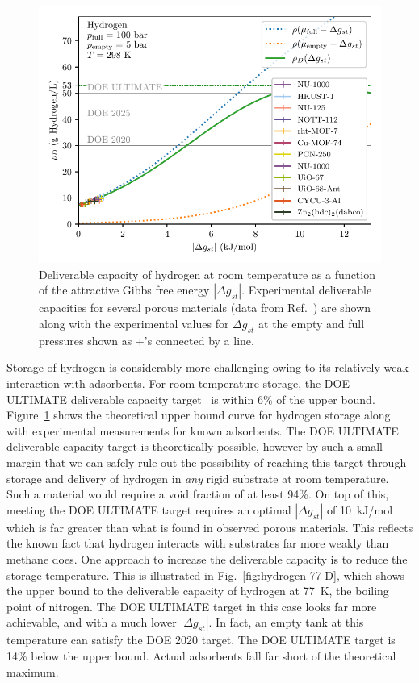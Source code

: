 \documentclass[twoside,twocolumn,9pt]{article}
\newcommand\gst{\ensuremath{\Delta g_{st}}}
\begin{document}
\begin{figure}
    \centering
    \includegraphics[width=0.95\columnwidth]{hydrogen-298-n-vs-G}
    \caption{Deliverable capacity of hydrogen at room temperature as a function of the attractive Gibbs free energy $|\gst|$.  Experimental deliverable capacities for several porous materials (data from Ref.~\cite{garcia2018benchmark}) are shown along with the experimental values for $\gst$ at the empty and full pressures shown as $+$'s connected by a line.}
    \label{fig:hydrogen-298-D}
\end{figure}

Storage of hydrogen is considerably more challenging owing to its relatively
weak interaction with adsorbents. For room temperature storage, the DOE
ULTIMATE deliverable capacity target~\cite{DOE} is within 6\% of the upper
bound. Figure~\ref{fig:hydrogen-298-D} shows the theoretical upper bound curve
for hydrogen storage along with experimental measurements for known adsorbents. The
DOE ULTIMATE deliverable capacity target is theoretically possible, however by
such a small margin that we can safely rule out the possibility of reaching
this target through storage and delivery of hydrogen in \emph{any} rigid
substrate at room temperature. Such a material would require a void fraction of
at least 94\%. On top of this, meeting the DOE ULTIMATE target requires an optimal
$|\gst|$ of 10~kJ/mol which is far greater than what is found in observed
porous materials. This reflects the known fact that hydrogen interacts with
substrates far more weakly than methane does. 
One approach to increase the deliverable capacity is to reduce the storage
temperature. This is illustrated in Fig.~\ref{fig:hydrogen-77-D}, which shows
the upper bound to the deliverable capacity of hydrogen at 77\ K, the boiling
point of nitrogen. The DOE ULTIMATE target in this case looks far more
achievable, and with a much lower $|\gst|$. In fact, an empty tank at this
temperature can satisfy the DOE 2020 target. The DOE ULTIMATE target is 14\%
below the upper bound. Actual adsorbents fall far short of the theoretical maximum.
\end{document}
